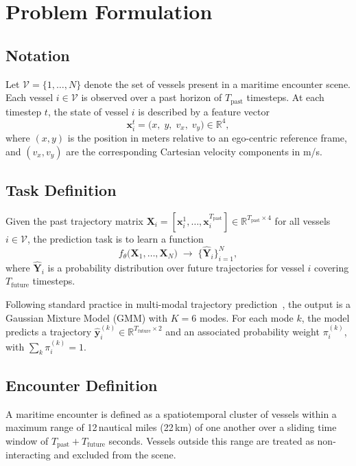 \documentclass[12pt, a4paper]{article}
\begin{document}
  \section{Problem Formulation}
  \label{sec:problem}

  \subsection{Notation}

  Let $\mathcal{V} = \{1, \dots, N\}$ denote the set of vessels present in a maritime encounter scene. Each vessel $i \in \mathcal{V}$ is observed over a past horizon of $T_{\text{past}}$ timesteps. At each
  timestep $t$, the state of vessel $i$ is described by a feature vector
  \[
      \mathbf{x}_i^t = \bigl(x,\; y,\; v_x,\; v_y\bigr) \in \mathbb{R}^4,
  \]
  where $(x, y)$ is the position in meters relative to an ego-centric reference frame, and $(v_x, v_y)$ are the corresponding Cartesian velocity components in m/s.

  \subsection{Task Definition}

  Given the past trajectory matrix $\mathbf{X}_i = [\mathbf{x}_i^1, \dots, \mathbf{x}_i^{T_{\text{past}}}] \in \mathbb{R}^{T_{\text{past}} \times 4}$ for all vessels $i \in \mathcal{V}$, the prediction task is
  to learn a function
  \[
      f_\theta\!\bigl(\mathbf{X}_1, \dots, \mathbf{X}_N\bigr)
      \;\longrightarrow\;
      \bigl\{\hat{\mathbf{Y}}_i\bigr\}_{i=1}^{N},
  \]
  where $\hat{\mathbf{Y}}_i$ is a probability distribution over future trajectories for vessel $i$ covering $T_{\text{future}}$ timesteps.

  Following standard practice in multi-modal trajectory prediction~\citep{nayakanti2022wayformer}, the output is a Gaussian Mixture Model (GMM) with $K = 6$ modes. For each mode $k$, the model predicts a
  trajectory $\hat{\mathbf{y}}_i^{(k)} \in \mathbb{R}^{T_{\text{future}} \times 2}$ and an associated probability weight $\pi_i^{(k)}$, with $\sum_k \pi_i^{(k)} = 1$.

  \subsection{Encounter Definition}

  A maritime encounter is defined as a spatiotemporal cluster of vessels within a maximum range of 12\,nautical miles (22\,km) of one another over a sliding time window of $T_{\text{past}} + T_{\text{future}}$
  seconds. Vessels outside this range are treated as non-interacting and excluded from the scene.
\end{document}
